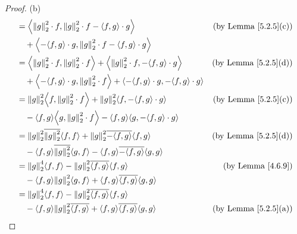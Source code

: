 \begin{proof}{(b)}
\begin{align*}
         & = \inner*{\norm*{g}_2^2 \cdot f, \norm*{g}_2^2 \cdot f - \inner*{f, g} \cdot g}                                          & \text{(by Lemma \ref{5.2.5}(c))}                \\
         & \quad + \inner*{-\inner*{f, g} \cdot g, \norm*{g}_2^2 \cdot f - \inner*{f, g} \cdot g}                                                                                     \\
         & = \inner*{\norm*{g}_2^2 \cdot f, \norm*{g}_2^2 \cdot f} + \inner*{\norm*{g}_2^2 \cdot f, -\inner*{f, g} \cdot g}         & \text{(by Lemma \ref{5.2.5}(d))}                \\
         & \quad + \inner*{-\inner*{f, g} \cdot g, \norm*{g}_2^2 \cdot f} + \inner*{-\inner*{f, g} \cdot g, -\inner*{f, g} \cdot g}                                                   \\
         & = \norm*{g}_2^2 \inner*{f, \norm*{g}_2^2 \cdot f} + \norm*{g}_2^2 \inner*{f, -\inner*{f, g} \cdot g}                     & \text{(by Lemma \ref{5.2.5}(c))}                \\
         & \quad - \inner*{f, g} \inner*{g, \norm*{g}_2^2 \cdot f} - \inner*{f, g} \inner*{g, -\inner*{f, g} \cdot g}                                                                 \\
         & = \norm*{g}_2^2 \overline{\norm*{g}_2^2} \inner*{f, f} + \norm*{g}_2^2 \overline{-\inner*{f, g}} \inner*{f, g}           & \text{(by Lemma \ref{5.2.5}(d))}                \\
         & \quad - \inner*{f, g} \overline{\norm*{g}_2^2} \inner*{g, f} - \inner*{f, g} \overline{-\inner*{f, g}} \inner*{g, g}                                                       \\
         & = \norm*{g}_2^4 \inner*{f, f} - \norm*{g}_2^2 \overline{\inner*{f, g}} \inner*{f, g}                                     & \text{(by Lemma \ref{4.6.9})}                   \\
         & \quad - \inner*{f, g} \norm*{g}_2^2 \inner*{g, f} + \inner*{f, g} \overline{\inner*{f, g}} \inner*{g, g}                                                                   \\
         & = \norm*{g}_2^4 \inner*{f, f} - \norm*{g}_2^2 \overline{\inner*{f, g}} \inner*{f, g}                                                                                       \\
         & \quad - \inner*{f, g} \norm*{g}_2^2 \overline{\inner*{f, g}} + \inner*{f, g} \overline{\inner*{f, g}} \inner*{g, g}      & \text{(by Lemma \ref{5.2.5}(a))}                \\

\end{align*}
\end{proof}
